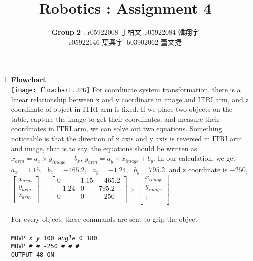 \documentclass[12pt, a4paper]{article}
\date{}
\title{\vspace{-3.0cm} Robotics : Assignment 4 \\ \vspace{0.5cm}}
\author{\textbf{Group 2} : \normalsize{r05922008 丁柏文\mbox{ }r05922084 韓翔宇} \\ \hspace{2.48cm} \normalsize{r05922146 葉興宇\mbox{ }b03902062 董文捷}}
\begin{document}
\maketitle
\begin{enumerate}

\item \textbf{Flowchart} \\
\texttt{[image: flowchart.JPG]}
For coordinate system transformation, there is a linear relationship between x and y coordinate in image and ITRI arm, and z coordinate of object in ITRI arm is fixed. If we place two objects on the table, capture the image to get their coordinates, and measure their coordinates in ITRI arm, we can solve out two equations. Something noticeable is that the direction of x axis and y axis is reversed in ITRI arm and image, that is to say, the equations should be written as $\displaystyle x_{arm} = a_x \times y_{image} + b_x$, $\displaystyle y_{arm} = a_y \times x_{image} + b_y$. In our calculation, we get $\displaystyle a_x = 1.15,\mbox{ }b_x = -465.2,\mbox{ }a_y = -1.24,\mbox{ }b_y = 795.2$, and z coordinate is $-250$,
$\begin{bmatrix}
x_{arm} \\
y_{arm} \\ 
z_{arm} \\
\end{bmatrix}$
=  
$\begin{bmatrix}
0 & 1.15 & -465.2 \\
-1.24 & 0 & 795.2 \\ 
0 & 0 & -250 \\
\end{bmatrix}$
$\times$
$\begin{bmatrix}
x_{image} \\
y_{image} \\ 
1 \\
\end{bmatrix}$ \\
\vspace*{0.6cm} \\
For every object, these commands are sent to grip the object \\
\vspace*{-0.4cm} \\
\texttt{MOVP \textit{x} \textit{y} 100 \textit{angle} 0 180} \\
\texttt{MOVP \# \# -250 \# \# \#} \\
\texttt{OUTPUT 48 ON} \\ 
\vspace*{-0.4cm} \\

\end{enumerate}
\end{document}
